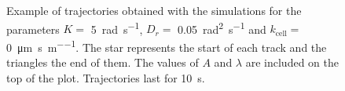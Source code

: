 \begin{figure}
	\centering
	
	\caption[Example of trajectories for the simulations]{Example of trajectories  obtained with the simulations for the parameters $K=$ \SI[per-mode = symbol]{5}{\radian\per\second}, $D_r=$ \SI[per-mode = symbol]{0.05}{\square\radian\per\second} and $k_{\text{cell}}=$ \SI[per-mode = symbol]{0}{\micro\meter\per\second\per\meter}. The star represents the start of each track and the triangles the end of them. The values of $A$ and $\lambda$ are included on the top of the plot. Trajectories last for \SI{10}{\second}.}
	\label{sim trajectories}
\end{figure}
